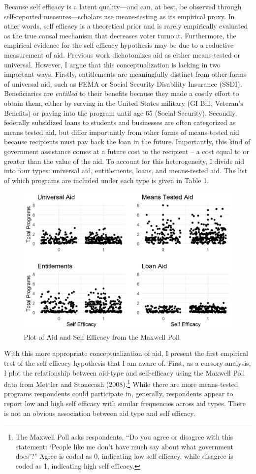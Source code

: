\documentclass[12pt]{paper}
\begin{document}
Because self efficacy is a latent quality—and can, at best, be observed through self-reported measures—scholars use means-testing as its empirical proxy. In other words, self efficacy is a theoretical prior and is rarely empirically evaluated as the true causal mechanism that decreases voter turnout. Furthermore, the empirical evidence for the self efficacy hypothesis may be due to a reductive measurement of aid. Previous work dichotomizes aid as either means-tested or universal. However, I argue that this conceptualization is lacking in two important ways. Firstly, entitlements are meaningfully distinct from other forms of universal aid, such as FEMA or Social Security Disability Insurance (SSDI). Beneficiaries are \textit{entitled} to their benefits because they made a costly effort to obtain them, either by serving in the United States military (GI Bill, Veteran's Benefits) or paying into the program until age 65 (Social Security). Secondly, federally subsidized loans to students and businesses are often categorized as means tested aid, but differ importantly from other forms of means-tested aid because recipients must pay back the loan in the future. Importantly, this kind of government assistance comes at a future cost to the recipient – a cost equal to or greater than the value of the aid. To account for this heterogeneity, I divide aid into four types: universal aid, entitlements, loans, and means-tested aid. The list of which programs are included under each type is given in Table 1.

\begin{figure} \centering
	\includegraphics[width=.8\linewidth]{Figs/scatter_SE.png}
	\caption{Plot of Aid and Self Efficacy from the Maxwell Poll}
	\label{}
\end{figure}

With this more appropriate conceptualization of aid, I present the first empirical test of the self efficacy hypothesis that I am aware of. First, as a cursory analysis, I plot the relationship between aid-type and self-efficacy using the Maxwell Poll data from Mettler and Stonecash (2008).\footnote{The Maxwell Poll asks respondents, ``Do you agree or disagree with this statement: `People like me don’t have much say about what government does'?" Agree is coded as 0, indicating low self efficacy, while disagree is coded as 1, indicating high self efficacy.} While there are more means-tested programs respondents could participate in, generally, respondents appear to report low and high self efficacy with similar frequencies across aid types. There is not an obvious association between aid type and self efficacy.
\end{document}
